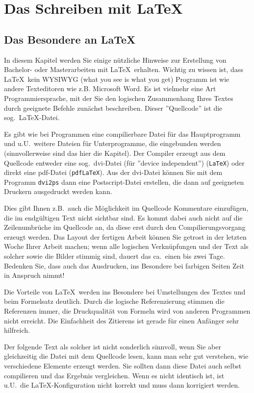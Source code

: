 \section {Das Schreiben mit \LaTeX}
\label{a:latex}

\subsection{Das Besondere an \LaTeX}

In diesem Kapitel werden Sie einige nützliche Hinweise zur
Erstellung von Bachelor- oder Masterarbeiten mit \LaTeX\ erhalten.
Wichtig zu wissen ist, dass \LaTeX\ kein WYSIWYG (what you see is
what you get) Programm ist wie andere Texteditoren wie z.B.
Microsoft Word. Es ist vielmehr eine Art Programmiersprache, mit
der Sie den logischen Zusammenhang Ihres Textes durch geeignete
Befehle zunächst beschreiben. Dieser ''Quellcode'' ist die sog.\
\LaTeX-Datei.

Es gibt wie bei Programmen eine compilierbare Datei für das
Hauptprogramm und u.U.\ weitere Dateien für Unterprogramme, die
eingebunden werden (sinnvollerweise sind das hier die Kapitel).
Der Compiler erzeugt aus dem Quellcode entweder eine sog.\
dvi-Datei (für ''device independent'') (\texttt{LaTeX}) oder direkt eine
pdf-Datei (\texttt{pdfLaTeX}). Aus der dvi-Datei können Sie mit dem
Programm \texttt{dvi2ps} dann eine Postscript-Datei erstellen, die dann auf
geeigneten Druckern ausgedruckt werden kann.

Dies gibt Ihnen z.B.\ auch die Möglichkeit im Quellcode Kommentare
einzufügen, die im endgültigen Text nicht sichtbar sind. Es kommt
dabei auch nicht auf die Zeilenumbrüche im Quellcode an, da diese
erst durch den Compilierungsvorgang erzeugt werden. Das Layout der
fertigen Arbeit können Sie getrost in der letzten Woche Ihrer Arbeit
machen; wenn alle logischen Verknüpfungen und der Text als solcher
sowie die Bilder stimmig sind, dauert das ca.\ einen bis zwei Tage. 
Bedenken Sie, dass auch das Ausdrucken, ins Besondere bei farbigen 
Seiten Zeit in Anspruch nimmt!

Die Vorteile von \LaTeX\ werden ins Besondere bei Umstellungen des
Textes und beim Formelsatz deutlich. Durch die logische
Referenzierung stimmen die Referenzen immer, die Druckqualität von
Formeln wird von anderen Programmen nicht erreicht. Die
Einfachheit des Zitierens ist gerade für einen Anfänger sehr
hilfreich.

Der folgende Text als solcher ist nicht sonderlich sinnvoll, wenn
Sie aber gleichzeitig die Datei mit dem Quellcode lesen, kann man
sehr gut verstehen, wie verschiedene Elemente erzeugt werden. Sie
sollten dann diese Datei auch selbst compilieren und das Ergebnis
vergleichen. Wenn es nicht identisch ist, ist u.U.\ die
\LaTeX-Konfiguration nicht korrekt und muss dann korrigiert werden.

